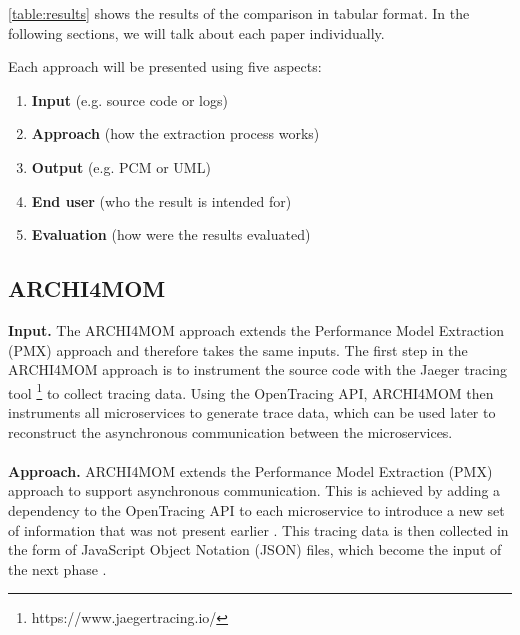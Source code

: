 \autoref{table:results} shows the results of the comparison in tabular format.
In the following sections, we will talk about each paper individually.

Each approach will be presented using five aspects:
\begin{enumerate}
	\item \textbf{Input} (e.g. source code or logs)
	\item \textbf{Approach} (how the extraction process works)
	\item \textbf{Output} (e.g. PCM or UML)
	\item \textbf{End user} (who the result is intended for)
	\item \textbf{Evaluation} (how were the results evaluated)
\end{enumerate}


\subsection{ARCHI4MOM}
\label{sec:Results:ARCHI4MOM}
\textbf{Input.}
The ARCHI4MOM approach extends the Performance Model Extraction (PMX) approach \cite{Walter2017PMX,Singh2022ARCHI4MOM} and therefore takes the same inputs.
The first step in the ARCHI4MOM approach is to instrument the source code with the Jaeger tracing tool \footnote{https://www.jaegertracing.io/} to collect tracing data.
Using the OpenTracing API, ARCHI4MOM then instruments all microservices to generate trace data, which can be used later to reconstruct the asynchronous communication between the microservices. \cite{Singh2022ARCHI4MOM} %
\\ \\
\textbf{Approach.}
ARCHI4MOM extends the Performance Model Extraction (PMX) approach \cite{Walter2017PMX,Singh2022ARCHI4MOM} to support asynchronous communication.
This is achieved by adding a dependency to the OpenTracing API to each microservice to introduce a new set of information that was not present earlier \cite{Singh2022ARCHI4MOM}.
This tracing data is then collected in the form of JavaScript Object Notation (JSON) files, which become the input of the next phase \cite{Singh2022ARCHI4MOM}.


